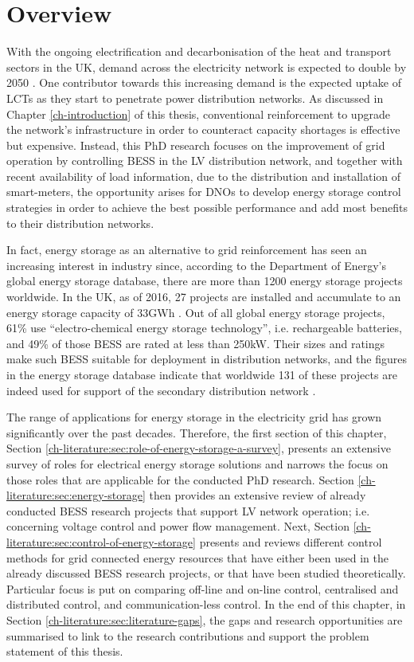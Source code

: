 \section{Overview}
\label{ch-literature:sec:overview}

With the ongoing electrification and decarbonisation of the heat and transport sectors in the UK, demand across the electricity network is expected to double by 2050 \cite{Wilks2010}.
One contributor towards this increasing demand is the expected uptake of LCTs as they start to penetrate power distribution networks.
As discussed in Chapter \ref{ch-introduction} of this thesis, conventional reinforcement to upgrade the network's infrastructure in order to counteract capacity shortages is effective but expensive.
Instead, this PhD research focuses on the improvement of grid operation by controlling BESS in the LV distribution network, and together with recent availability of load information, due to the distribution and installation of smart-meters, the opportunity arises for DNOs to develop energy storage control strategies in order to achieve the best possible performance and add most benefits to their distribution networks.

In fact, energy storage as an alternative to grid reinforcement has seen an increasing interest in industry since, according to the Department of Energy's global energy storage database, there are more than 1200 energy storage projects worldwide.
In the UK, as of 2016, 27 projects are installed and accumulate to an energy storage capacity of 33GWh \cite{Garton2016}.
Out of all global energy storage projects, 61\% use ``electro-chemical energy storage technology'', i.e. rechargeable batteries, and 49\% of those BESS are rated at less than 250kW.
Their sizes and ratings make such BESS suitable for deployment in distribution networks, and the figures in the energy storage database indicate that worldwide 131 of these projects are indeed used for support of the secondary distribution network \cite{DOE-GESD}.

The range of applications for energy storage in the electricity grid has grown significantly over the past decades.
Therefore, the first section of this chapter, Section \ref{ch-literature:sec:role-of-energy-storage-a-survey}, presents an extensive survey of roles for electrical energy storage solutions and narrows the focus on those roles that are applicable for the conducted PhD research.
Section \ref{ch-literature:sec:energy-storage} then provides an extensive review of already conducted BESS research projects that support LV network operation; i.e. concerning voltage control and power flow management.
Next, Section \ref{ch-literature:sec:control-of-energy-storage} presents and reviews different control methods for grid connected energy resources that have either been used in the already discussed BESS research projects, or that have been studied theoretically.
Particular focus is put on comparing off-line and on-line control, centralised and distributed control, and communication-less control.
In the end of this chapter, in Section \ref{ch-literature:sec:literature-gaps}, the gaps and research opportunities are summarised to link to the research contributions and support the problem statement of this thesis.
